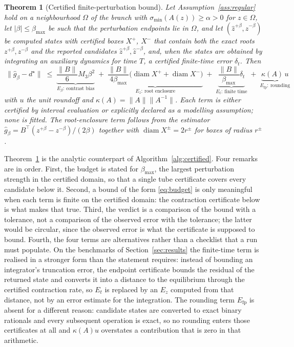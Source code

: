 \documentclass[11pt]{article}
\newtheorem{theorem}{Theorem}
\theoremstyle{definition}
\theoremstyle{remark}
\newcommand{\norm}[1]{\lVert #1 \rVert}
\newcommand{\abs}[1]{\lvert #1 \rvert}
\newcommand{\diam}{\operatorname{diam}}
\newcommand{\betamax}{\beta_{\max}}
\begin{document}
\begin{theorem}[Certified finite-perturbation bound]\label{thm:budget}
Let Assumption~\ref{ass:regular} hold on a neighbourhood $\Omega$ of the branch with
$\sigma_{\min}(A(z)) \ge \alpha > 0$ for $z \in \Omega$, let $\abs{\beta} \le \betamax$ be such
that the perturbation endpoints lie in $\Omega$, and let $(\widehat z^{+\beta}, \widehat z^{-\beta})$
be computed states with certified boxes $X^+$, $X^-$ that contain both the exact roots
$z^{+\beta}, z^{-\beta}$ and the reported candidates $\widehat z^{+\beta}, \widehat z^{-\beta}$,
and, when the states are obtained by
integrating an auxiliary dynamics for time $T$, a certified
finite-time error $\delta_t$. Then
\begin{equation}
\boxed{\
\norm{\widehat g_\beta - d^\star}
\;\le\;
\underbrace{\frac{\norm{B}}{6} M_3 \beta^2}_{E_\beta:\ \text{contrast bias}}
\;+\;
\underbrace{\frac{\norm{B}}{4\betamax}\bigl(\diam X^+ + \diam X^-\bigr)}_{E_z:\ \text{root enclosure}}
\;+\;
\underbrace{\frac{\norm{B}}{\betamax}\delta_t}_{E_t:\ \text{finite time}}
\;+\;
\underbrace{\kappa(A)\, u}_{E_{\mathrm{fp}}:\ \text{rounding}}
\ }
\label{eq:budget}
\end{equation}
with $u$ the unit roundoff and $\kappa(A) = \norm{A}\norm{A^{-1}}$. Each term is either certified
by interval evaluation or explicitly declared as a modelling assumption; none is fitted. The
root-enclosure term follows from the estimator $\widehat g_\beta = B^{\top}(z^{+\beta} -
z^{-\beta})/(2\beta)$ together with $\diam X^\pm = 2 r^\pm$ for boxes of radius $r^\pm$.
\end{theorem}

Theorem~\ref{thm:budget} is the analytic counterpart of Algorithm~\ref{alg:certified}. Four
remarks are in order. First, the budget is stated for $\betamax$, the largest perturbation
strength in the certified domain, so that a single tube certificate covers every candidate below
it. Second, a bound of the form \eqref{eq:budget} is only meaningful when each term is finite on
the certified domain: the contraction certificate below is what makes that true. Third, the
verdict is a comparison of the bound with a tolerance, not a comparison of the observed error
with the tolerance; the latter would be circular, since the observed error is what the certificate
is supposed to bound. Fourth, the four terms are alternatives rather than a checklist that a run
must populate. On the benchmarks of Section~\ref{sec:results} the finite-time term is realised in
a stronger form than the statement requires: instead of bounding an integrator's truncation error,
the endpoint certificate bounds the residual of the returned state and converts it into a distance
to the equilibrium through the certified contraction rate, so $E_t$ is replaced by an
$E_z$ computed from that distance, not by an error estimate for the integration. The rounding term
$E_{\mathrm{fp}}$ is absent for a different reason: candidate states are converted to exact binary
rationals and every subsequent operation is exact, so no rounding enters those certificates at all
and $\kappa(A)u$ overstates a contribution that is zero in that arithmetic.
\end{document}
